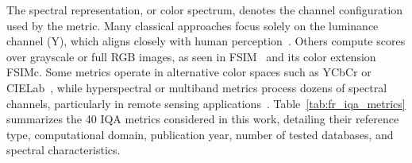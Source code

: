 The spectral representation, or color spectrum, denotes the channel configuration used by the metric. Many classical approaches focus solely on the luminance channel (Y), which aligns closely with human perception~\cite{sheikh_vif_2006, chandler2007vsnr}. Others compute scores over grayscale or full RGB images, as seen in FSIM~\cite{zhang2011fsim} and its color extension FSIMc. Some metrics operate in alternative color spaces such as YCbCr or CIELab~\cite{Wang2002PQM}, while hyperspectral or multiband metrics process dozens of spectral channels, particularly in remote sensing applications~\cite{Zhou1998SCC,Alparone2008QNR}. Table~\ref{tab:fr_iqa_metrics} summarizes the 40 IQA metrics considered in this work, detailing their reference type, computational domain, publication year, number of tested databases, and spectral characteristics.



